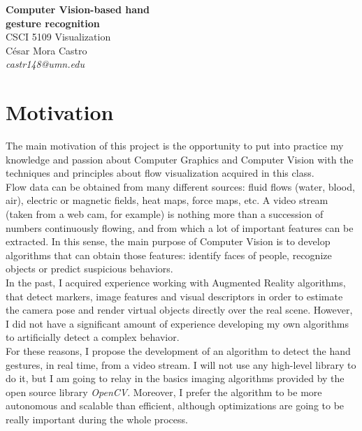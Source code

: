 \documentclass[11pt,a4paper]{article}
\begin{document}
\begin{center}
{\LARGE \textbf{Computer Vision-based hand\\gesture recognition\\}}
\vspace{0.2cm}
CSCI 5109 Visualization\\
César Mora Castro\\
\textit{castr148@umn.edu}\\
\end{center}
\vspace{1cm}



\section{Motivation}
The main motivation of this project is the opportunity to put into practice my knowledge and passion about Computer Graphics and Computer Vision with the techniques and principles about flow visualization acquired in this class.\\

Flow data can be obtained from many different sources: fluid flows (water, blood, air), electric or magnetic fields,  heat maps, force maps, etc. A video stream (taken from a web cam, for example) is nothing more than a succession of numbers continuously flowing, and from which a lot of important features can be extracted. In this sense, the main purpose of Computer Vision is to develop algorithms that can obtain those features: identify faces of people, recognize objects or predict suspicious behaviors.\\

In the past, I acquired experience working with Augmented Reality algorithms, that detect markers, image features and visual descriptors in order to estimate the camera pose and render virtual objects directly over the real scene. However, I did not have a significant amount of experience developing my own algorithms to artificially detect a complex behavior.\\

For these reasons, I propose the development of an  algorithm to detect the hand gestures, in real time, from a video stream. I will not use any high-level library to do it, but I am going to relay in the basics imaging algorithms provided by the open source library \textit{OpenCV}. Moreover, I prefer the algorithm to be more autonomous and scalable than efficient, although optimizations are going to be really important during the whole process.\\
\end{document}
